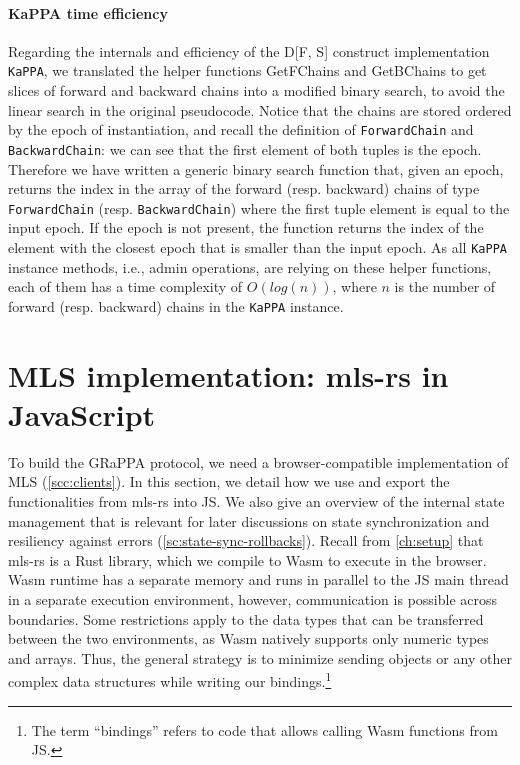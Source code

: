 \paragraph{KaPPA time efficiency}

Regarding the internals and efficiency of the D[F, S] construct
implementation \texttt{KaPPA}, we translated the helper functions 
GetFChains and GetBChains to get
slices of forward and backward chains into a modified binary search,
to avoid the linear search in the original pseudocode.
Notice that the chains are stored ordered by the epoch of instantiation,
and recall the definition of \texttt{ForwardChain} and \texttt{BackwardChain}:
we can see that the first element of both tuples is the epoch.
Therefore we have written a generic binary search function that,
given an epoch, returns the index in the array of the forward (resp. backward)
chains of type \texttt{ForwardChain} (resp. \texttt{BackwardChain})
where the first tuple element is equal to the input epoch. If the epoch is not
present, the function returns the index of the element with the 
closest epoch that is smaller than the input epoch.
As all \texttt{KaPPA} instance methods, i.e., admin operations,
are relying on these helper functions, each of them has a time
complexity of $O(log(n))$, where $n$ is the number of forward (resp. backward)
chains in the \texttt{KaPPA} instance.

\section{MLS implementation: mls-rs in JavaScript}\label{sc:js-bindings-for-mls}

To build the GRaPPA protocol, we need a browser-compatible implementation
of MLS (\cref{scc:clients}).
In this section, we detail how we use and export the functionalities from mls-rs
into JS. We also give an overview of the internal state management
that is relevant for later discussions on state synchronization and resiliency
against errors (\cref{sc:state-sync-rollbacks}).
Recall from \cref{ch:setup} that mls-rs is a Rust library, which we
compile to Wasm to execute in the browser.
Wasm runtime has a separate memory and runs in parallel
to the JS main thread in a separate execution environment, however, communication
is possible across boundaries. Some restrictions apply to the data types
that can be transferred between the two environments, as Wasm natively supports
only numeric types and arrays. Thus, the general strategy 
is to minimize sending objects or any other complex data structures 
while writing our bindings.\footnote{The term ``bindings'' refers to code that allows calling Wasm functions from JS.}

